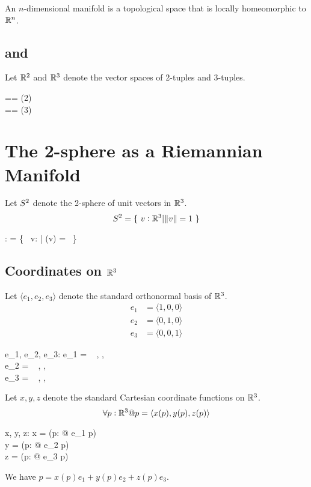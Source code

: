 \documentclass[11pt, oneside]{article}
\begin{document}
An $n$-dimensional manifold is a topological space that is locally homeomorphic to $\mathbb{R}^n$.

\subsection{ and }

Let $\mathbb{R}^2$ and $\mathbb{R}^3$ denote the vector spaces of 2-tuples and 3-tuples.
\begin{zed}
	\Rtwo == \Rtuples(2) \\
	\Rthree == \Rtuples(3)
\end{zed}


\section{The 2-sphere as a Riemannian Manifold}

Let $S^2$ denote the 2-sphere of unit vectors in $\mathbb{R}^3$.
\begin{equation}
	S^2 = \{~ v: \mathbb{R}^3 | \norm{v} = 1 ~\}
\end{equation}

\begin{axdef}
	\Stwo: \power \Rthree
\where
	\Stwo = \{~ v: \Rthree | \normR(v) = \oneR ~\}
\end{axdef}

\subsection{Coordinates on $\mathbb{R}^3$}

Let $\langle e_1, e_2, e_3 \rangle$ denote the standard orthonormal basis of $\mathbb{R}^3$.
\begin{align}
e_1 & = \langle1, 0, 0 \rangle \\
e_2 & = \langle 0, 1, 0 \rangle \\
e_3 & = \langle 0, 0, 1 \rangle
\end{align}
\begin{axdef}
	e_1, e_2, e_3: \Rthree
\where
	e_1 = \langle~ \oneR, \zeroR, \zeroR ~\rangle \\
	e_2 = \langle~ \zeroR, \oneR, \zeroR ~\rangle \\
	e_3 = \langle~ \zeroR, \zeroR, \oneR ~\rangle
\end{axdef}

Let $x, y, z$ denote the standard Cartesian coordinate functions on $\mathbb{R}^3$.
\begin{equation}
\forall p : \mathbb{R}^3 @ p = \langle x(p), y(p), z(p) \rangle
\end{equation}
\begin{axdef}
	x, y, z: \Rthree \fun \R
\where
	x = (\lambda p: \Rthree @ e_1 \dotR p) \\
	y = (\lambda p: \Rthree @ e_2 \dotR p) \\
	z = (\lambda p: \Rthree @ e_3 \dotR p)
\end{axdef}
\begin{remark}
We have $p = x(p) e_1 + y(p) e_2 + z(p) e_3$.
\end{remark}
\end{document}
